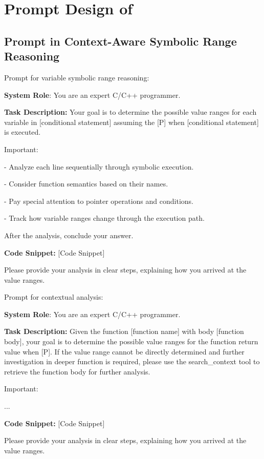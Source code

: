 \section{Prompt Design of \app{}}
\label{ap:prompt}

\subsection{Prompt in Context-Aware Symbolic Range Reasoning}

Prompt for variable symbolic range reasoning:

\begin{mdframed}
[linecolor=myblue!50,linewidth=2pt,roundcorner=10pt,backgroundcolor=myyellow!20]
\small

\hspace{3.5mm} \textbf{System Role}: You are an expert C/C++ programmer. 

\textbf{Task Description:} Your goal is to determine the possible value ranges for each variable in [conditional statement] assuming the [P] when [conditional statement]  is executed.

Important:

- Analyze each line sequentially through symbolic execution.

- Consider function semantics based on their names.

- Pay special attention to pointer operations and conditions.

- Track how variable ranges change through the execution path.

After the analysis, conclude your answer. 

\textbf{Code Snippet:} [Code Snippet]

Please provide your analysis in clear steps, explaining how you arrived at the value ranges.

\end{mdframed}

Prompt for contextual analysis:

\begin{mdframed}
[linecolor=myblue!50,linewidth=2pt,roundcorner=10pt,backgroundcolor=myyellow!20]
\small

\hspace{3.5mm} \textbf{System Role}: You are an expert C/C++ programmer. 

\textbf{Task Description:} 
Given the function [function name] with body [function body],
your goal is to determine the possible value ranges for the function return value when [P]. If the value range cannot be directly determined and further investigation in deeper function is required, please use the search\_context tool to retrieve the function body for further analysis. 

Important:

... 

\textbf{Code Snippet:} [Code Snippet]

Please provide your analysis in clear steps, explaining how you arrived at the value ranges.

\end{mdframed}


